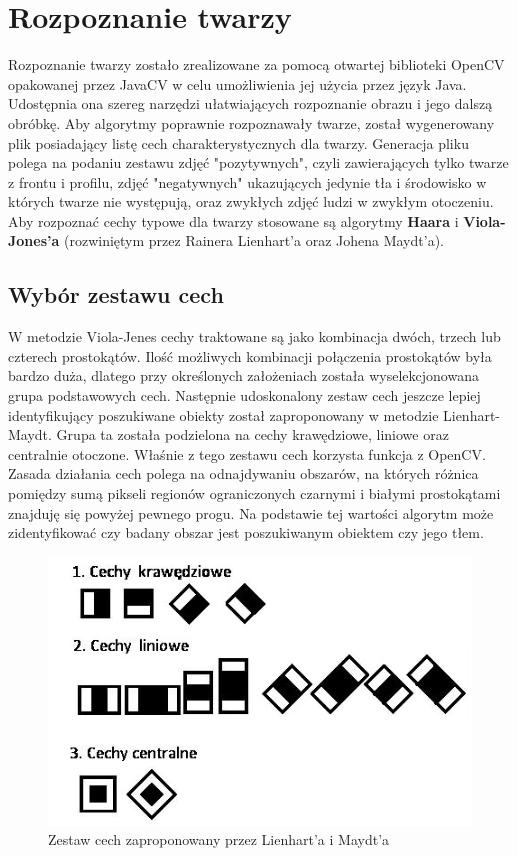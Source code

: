 \section{Rozpoznanie twarzy}
Rozpoznanie twarzy zostało zrealizowane za pomocą otwartej biblioteki OpenCV opakowanej przez JavaCV w celu umożliwienia jej użycia przez język Java. Udostępnia ona szereg narzędzi ułatwiających rozpoznanie obrazu i jego dalszą obróbkę. Aby algorytmy poprawnie rozpoznawały twarze, został wygenerowany plik posiadający listę cech charakterystycznych dla twarzy. Generacja pliku polega na podaniu zestawu zdjęć "pozytywnych", czyli zawierających tylko twarze z frontu i profilu, zdjęć "negatywnych" ukazujących jedynie tła i środowisko w których twarze nie występują, oraz zwykłych zdjęć ludzi w zwykłym otoczeniu. 
Aby rozpoznać cechy typowe dla twarzy stosowane są algorytmy \textbf{Haara} i \textbf{Viola-Jones'a} (rozwiniętym przez Rainera Lienhart'a oraz Johena Maydt’a).

\subsection{Wybór zestawu cech}
W metodzie Viola-Jenes cechy traktowane są jako kombinacja dwóch, trzech lub czterech prostokątów. Ilość możliwych kombinacji połączenia prostokątów była bardzo duża, dlatego przy określonych założeniach została wyselekcjonowana grupa podstawowych cech. Następnie udoskonalony zestaw cech jeszcze lepiej identyfikujący poszukiwane obiekty został zaproponowany w metodzie Lienhart-Maydt. Grupa ta została podzielona na cechy krawędziowe, liniowe oraz centralnie otoczone. Właśnie z tego zestawu cech korzysta funkcja z OpenCV. Zasada działania cech polega na odnajdywaniu obszarów, na których różnica pomiędzy sumą pikseli regionów ograniczonych czarnymi i białymi prostokątami znajduję się powyżej pewnego progu. Na podstawie tej wartości algorytm może zidentyfikować czy badany obszar jest poszukiwanym obiektem czy jego tłem.

\begin{figure}[h]
\centering
\includegraphics[scale=0.5]{./violajones.jpg}
\caption[Cechy rozpoznawane przez OpenCV]{Zestaw cech zaproponowany przez Lienhart'a i Maydt'a}
\end{figure}

